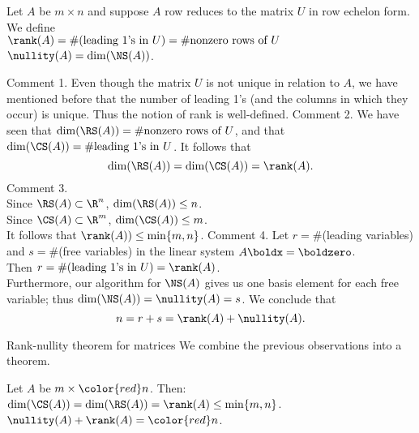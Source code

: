 \begin{frame}%
\footnotesize
\begin{definition}
Let $A$ be $m\times n$ and suppose $A$ row reduces to the matrix $U$ in row echelon form. We define 
\\
$\rank(A)=\#\text{(leading 1's in $U$)}=\#\text{nonzero rows of $U$}$
\\
$\nullity(A)=\dim(\NS(A))$.

\end{definition}
\pause
\alert{Comment 1}. Even though the matrix $U$ is not unique in relation to $A$, we have mentioned before that the number of leading 1's (and the columns in which they occur) \alert{is} unique. Thus the notion of rank is well-defined. 
\bpause
\alert{Comment 2}. We have seen that $\dim(\RS(A))=\#\text{nonzero rows of $U$}$, and that $\dim(\CS(A))=\#\text{leading 1's in $U$}$. It follows that
\[
\dim(\RS(A))=\dim(\CS(A))=\rank(A).
\]
\pause
\alert{Comment 3.} \\
Since $\RS(A)\subset \R^n$, $\dim(\RS(A))\leq n$. \\ 
Since $\CS(A)\subset\R^m$, $\dim(\CS(A))\leq m$. \\
It follows that $\rank(A))\leq \min\{m,n\}$.
\bpause
\alert{Comment 4.} Let $r=\#$(leading variables) and $s=\#$(free variables) in the linear system $A\boldx=\boldzero$. \\
Then $r=\#\text{(leading 1's in $U$)}=\rank(A)$. 
\\
Furthermore, our algorithm for $\NS(A)$ gives us one basis element for each free variable; thus $\dim(\NS(A))=\nullity(A)=s$. We conclude that 
\[
n=r+s=\rank(A)+\nullity(A).
\]
\end{frame}
\begin{frame}{Rank-nullity theorem for matrices}
We combine the previous observations into a theorem. 
\begin{theorem}
Let $A$ be $m\times {\color{red} n}$. Then:
\bb
\ii $\dim(\CS(A))=\dim(\RS(A))=\rank(A)\leq\min\{m,n\}$.
\ii $\nullity(A)+\rank(A)={\color{red} n}$.
\ee
\end{theorem}

\end{frame}
